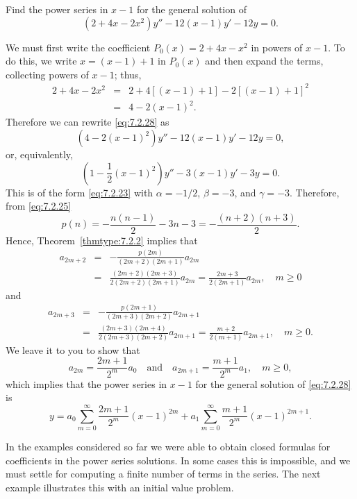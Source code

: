 \documentclass{ximera}
\begin{document}
\begin{example}\label{example:7.2.3}
Find the power series in $x-1$  for the general
solution of
\begin{equation}\label{eq:7.2.28}
(2+4x-2x^2)y''-12(x-1)y'-12y=0.
\end{equation}
\begin{explanation}
We must first write the coefficient $P_0(x)=2+4x-x^2$ in powers of
$x-1$. To do this,
 we write $x=(x-1)+1$ in $P_0(x)$ and then expand
the terms, collecting powers of $x-1$;   thus,
\begin{eqnarray*}
2+4x-2x^2&=&2+4[(x-1)+1]-2[(x-1)+1]^2\\
&=&4-2(x-1)^2.
\end{eqnarray*}
  Therefore we can rewrite \eqref{eq:7.2.28} as
$$
\left(4-2(x-1)^2\right)y''-12(x-1)y'-12y=0,
$$
or, equivalently,
$$
\left(1-\frac{1}{2}(x-1)^2\right)y''-3(x-1)y'-3y=0.
$$
This is of the form \eqref{eq:7.2.23} with  $\alpha=-1/2$, $\beta=-3$, and
$\gamma=-3$. Therefore, from \eqref{eq:7.2.25}
$$
p(n)=-\frac{n(n-1)}{2}-3n-3=-\frac{(n+2)(n+3)}{2}.
$$
Hence, Theorem~\ref{thmtype:7.2.2} implies that
\begin{eqnarray*}
a_{2m+2}&=&-\frac{p(2m)}{(2m+2)(2m+1)}a_{2m}\\&=&
\frac{(2m+2)(2m+3)}{2(2m+2)(2m+1)}
a_{2m}=\frac{2m+3}{2(2m+1)}a_{2m},\quad m\geq0
\end{eqnarray*}
and
\begin{eqnarray*}
a_{2m+3}&=&-\frac{p(2m+1)}{(2m+3)(2m+2)}a_{2m+1}\\&=&
\frac{(2m+3)(2m+4)}{2
(2m+3)(2m+2)}a_{2m+1}=\frac{m+2}{2(m+1)}a_{2m+1},\quad m\geq0.
\end{eqnarray*}
We leave it to you to show that
$$
a_{2m}=\frac{2m+1}{2^m}a_0\quad\mbox{and}\quad
a_{2m+1}=\frac{m+1}{2^m}a_1,\quad m\geq0,
$$
which implies that the power series in $x-1$ for the general solution
of
\eqref{eq:7.2.28} is
$$
y=a_0\sum_{m=0}^\infty\frac{2m+1}{2^m}(x-1)^{2m}+a_1\sum_{m=0}^\infty
\frac{m+1}{2^m}(x-1)^{2m+1}.
$$
\end{explanation}
\end{example}

In the examples considered so far we were able to obtain closed
formulas for coefficients in the power series solutions. In some cases
this is impossible, and we must settle for computing a finite number
of terms in the series. The next example illustrates this with an
initial value problem.
\end{document}
